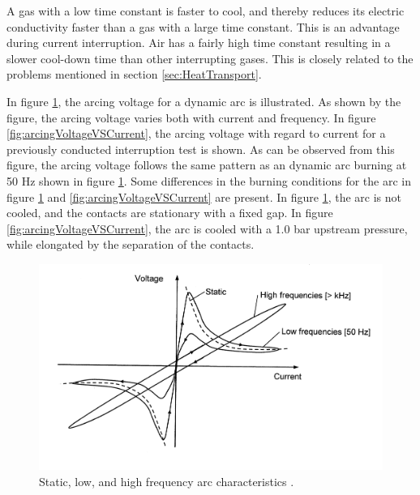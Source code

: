 \documentclass[10pt,b5paper,twoside]{article}
\begin{document}
A gas with a low time constant is faster to cool, and thereby reduces its electric conductivity faster than a gas with a large time constant. This is an advantage during current interruption. Air has a fairly high time constant resulting in a slower cool-down time than other interrupting gases. This is closely related to the problems mentioned in section \ref{sec:HeatTransport}. 

In figure \ref{fig:arcingVoltageFre}, the arcing voltage for a dynamic arc is illustrated. As shown by the figure, the arcing voltage varies both with current and frequency. In figure \ref{fig:arcingVoltageVSCurrent}, the arcing voltage with regard to current for a previously conducted interruption test is shown. As can be observed from this figure, the arcing voltage follows the same pattern as an dynamic arc burning at 50 Hz shown in figure \ref{fig:arcingVoltageFre}. Some differences in the burning conditions for the arc in figure \ref{fig:arcingVoltageFre} and \ref{fig:arcingVoltageVSCurrent} are present. In figure \ref{fig:arcingVoltageFre}, the arc is not cooled, and the contacts are stationary with a fixed gap. In figure \ref{fig:arcingVoltageVSCurrent}, the arc is cooled with a 1.0 bar upstream pressure, while elongated by the separation of the contacts.

\begin{figure}[H]
\centering
\includegraphics[scale=1]{Bilder/Theory/dynamicArcingVoltage.png}
\caption{Static, low, and high frequency arc characteristics  \cite{bib:HVEbreak}.} \label{fig:arcingVoltageFre}
\end{figure}
\end{document}
